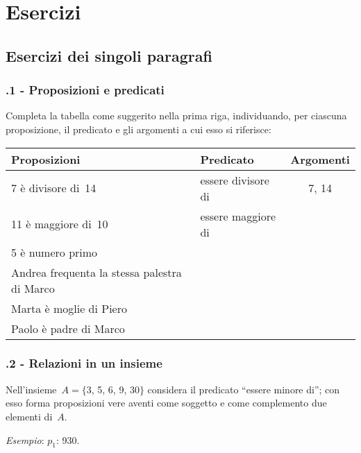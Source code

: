 \section{Esercizi}
\subsection{Esercizi dei singoli paragrafi}
\subsubsection*{\thechapter.1 - Proposizioni e predicati}

\begin{esercizio}
\label{ese:\thechapter.1}
Completa la tabella come suggerito nella prima riga, individuando, per ciascuna proposizione, il predicato e gli argomenti a cui esso si riferisce:
\begin{center}
\begin{tabular}{llc}
\toprule
Proposizioni & Predicato & Argomenti\\
\midrule
7 è divisore di~14 & essere divisore di & 7, 14 \\
11 è maggiore di~10 & essere maggiore di & \\
5 è numero primo & & \\
Andrea frequenta la stessa palestra di Marco & & \\
Marta è moglie di Piero & & \\
Paolo è padre di Marco & & \\
\bottomrule
\end{tabular}
\end{center}
\end{esercizio}

\subsubsection*{\thechapter.2 - Relazioni in un insieme}
\begin{esercizio}
\label{ese:\thechapter.2}
Nell'insieme~$A = \{$3, 5, 6, 9, 30$\}$ considera il predicato ``essere minore di''; con esso forma proposizioni vere aventi come soggetto e come complemento due elementi di~$A$.

\emph{Esempio}: $p_1$: 930.
\end{esercizio}

